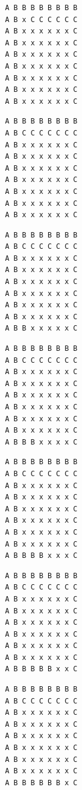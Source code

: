 { \begin{verbatim}
         A B B B B B B B B
         A B x C C C C C C
         A B x x x x x x C
         A B x x x x x x C
         A B x x x x x x C
         A B x x x x x x C
         A B x x x x x x C
         A B x x x x x x C
         A B x x x x x x C
\end{verbatim} }

{ \begin{verbatim}
         A B B B B B B B B
         A B C C C C C C C
         A B x x x x x x C
         A B x x x x x x C
         A B x x x x x x C
         A B x x x x x x C
         A B x x x x x x C
         A B x x x x x x C
         A B x x x x x x C
\end{verbatim} }

{ \begin{verbatim}
         A B B B B B B B B
         A B C C C C C C C
         A B x x x x x x C
         A B x x x x x x C
         A B x x x x x x C
         A B x x x x x x C
         A B x x x x x x C
         A B x x x x x x C
         A B B x x x x x C
\end{verbatim} }

{ \begin{verbatim}
         A B B B B B B B B
         A B C C C C C C C
         A B x x x x x x C
         A B x x x x x x C
         A B x x x x x x C
         A B x x x x x x C
         A B x x x x x x C
         A B x x x x x x C
         A B B B x x x x C
\end{verbatim} }

{ \begin{verbatim}
         A B B B B B B B B
         A B C C C C C C C
         A B x x x x x x C
         A B x x x x x x C
         A B x x x x x x C
         A B x x x x x x C
         A B x x x x x x C
         A B x x x x x x C
         A B B B B x x x C
\end{verbatim} }

{ \begin{verbatim}
         A B B B B B B B B
         A B C C C C C C C
         A B x x x x x x C
         A B x x x x x x C
         A B x x x x x x C
         A B x x x x x x C
         A B x x x x x x C
         A B x x x x x x C
         A B B B B B x x C
\end{verbatim} }

{ \begin{verbatim}
         A B B B B B B B B
         A B C C C C C C C
         A B x x x x x x C
         A B x x x x x x C
         A B x x x x x x C
         A B x x x x x x C
         A B x x x x x x C
         A B x x x x x x C
         A B B B B B B x C
\end{verbatim} }


